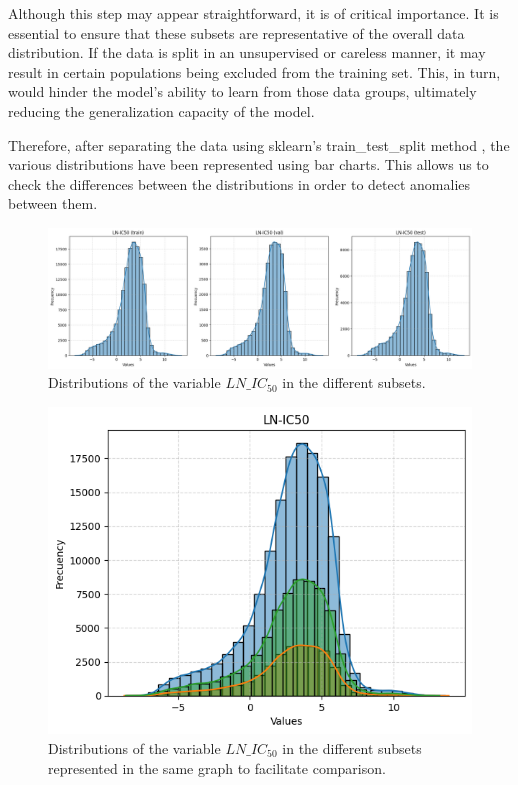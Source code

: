 Although this step may appear straightforward, it is of critical importance. It is essential to ensure that these subsets are representative of the overall data distribution. If the data is split in an unsupervised or careless manner, it may result in certain populations being excluded from the training set. This, in turn, would hinder the model's ability to learn from those data groups, ultimately reducing the generalization capacity of the model.

Therefore, after separating the data using sklearn's train\_test\_split method \cite{scikit-learn-train-test-split}, the various distributions have been represented using bar charts. This allows us to check the differences between the distributions in order to detect anomalies between them.

\begin{figure}[H]
    \centering
    \includegraphics[width=1\textwidth]{figures/data_representation/LNIC50-splits.png}
    \caption{Distributions of the variable \(LN\_IC_{50}\) in the different subsets.}
    \label{fig:lnic50Split}
\end{figure}

\begin{figure}[H]
    \centering
    \includegraphics[width=1\textwidth]{figures/data_representation/LNIC50-splits-joined.png}
    \caption{Distributions of the variable \(LN\_IC_{50}\) in the different subsets represented in the same graph to facilitate comparison.}
    \label{fig:lnic50SplitJoined}
\end{figure}

